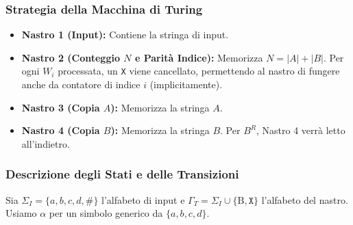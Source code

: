 \documentclass[a4paper, 11pt]{book} %
\theoremstyle{definition}
\newcommand{\B}{\text{B}} %
\begin{document}
\subsubsection{Strategia della Macchina di Turing}
\begin{itemize}
    \item \textbf{Nastro 1 (Input):} Contiene la stringa di input.
    \item \textbf{Nastro 2 (Conteggio $N$ e Parità Indice):} Memorizza $N = |A| + |B|$. Per ogni $W_i$ processata, un \texttt{X} viene cancellato, permettendo al nastro di fungere anche da contatore di indice $i$ (implicitamente).
    \item \textbf{Nastro 3 (Copia $A$):} Memorizza la stringa $A$.
    \item \textbf{Nastro 4 (Copia $B$):} Memorizza la stringa $B$. Per $B^R$, Nastro 4 verrà letto all'indietro.
\end{itemize}

\subsubsection{Descrizione degli Stati e delle Transizioni}
Sia $\Sigma_I = \{a,b,c,d,\texttt{\#}\}$ l'alfabeto di input e $\Gamma_T = \Sigma_I \cup \{\B, \texttt{X}\}$ l'alfabeto del nastro. Usiamo $\alpha$ per un simbolo generico da $\{a,b,c,d\}$.
\end{document}
